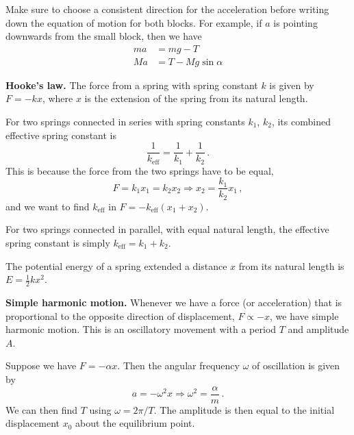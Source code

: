 \documentclass{article}
\begin{document}
Make sure to choose a consistent direction for the acceleration before writing down the equation of motion for both blocks. For example, if $a$ is pointing downwards from the small block, then we have
\begin{align*}
    ma &= mg -T\\
    Ma &= T - Mg\sin\alpha
\end{align*}

\textbf{Hooke's law.} The force from a spring with spring constant $k$ is given by $F=-kx$, where $x$ is the extension of the spring from its natural length.

For two springs connected in series with spring constants $k_1$, $k_2$, its combined effective spring constant is
\[
\frac{1}{k_{\text{eff}}}=\frac{1}{k_1}+\frac{1}{k_2}\,.
\]
This is because the force from the two springs have to be equal,
\[
F=k_1x_1=k_2x_2\Rightarrow x_2=\frac{k_1}{k_2}x_1\,,
\]
and we want to find $k_\text{eff}$ in $F=-k_\text{eff}(x_1+x_2)$.

For two springs connected in parallel, with equal natural length, the effective spring constant is simply $k_\text{eff}=k_1+k_2$.

The potential energy of a spring extended a distance $x$ from its natural length is $E=\frac{1}{2}kx^2$.

\textbf{Simple harmonic motion.} Whenever we have a force (or acceleration) that is proportional to the opposite direction of displacement, $F\propto -x$, we have simple harmonic motion. This is an oscillatory movement with a period $T$ and amplitude $A$.

Suppose we have $F=-\alpha x$. Then the angular frequency $\omega$ of oscillation is given by
\[
a=-\omega^2x\Rightarrow\omega^2=\frac{\alpha}{m}\,.
\]
We can then find $T$ using $\omega=2\pi/T$. The amplitude is then equal to the initial displacement $x_0$ about the equilibrium point.
\begin{figure}[h]
    \centering
\end{figure}
\end{document}
